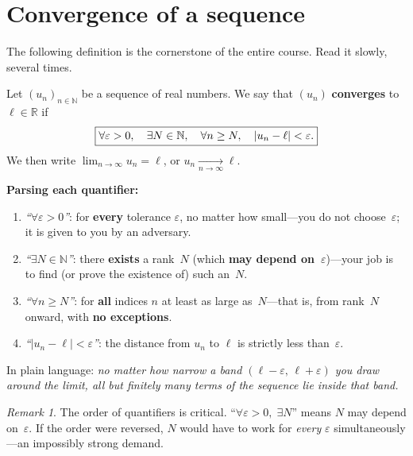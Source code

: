 \documentclass[12pt,a4paper,openany]{book}
\newcommand{\N}{\mathbb{N}}
\newcommand{\R}{\mathbb{R}}
\newcommand{\eps}{\varepsilon}
\newcommand{\abs}[1]{\left\lvert #1 \right\rvert}
\theoremstyle{definition}
\theoremstyle{remark}
\newtheorem{remark}{Remark}[chapter]
\begin{document}
\section{Convergence of a sequence}\label{sec:convergence}

The following definition is the cornerstone of the entire course. Read it
slowly, several times.

\begin{tcolorbox}[
   colback=blue!3!white,
   colframe=blue!60!black,
   title={\textbf{Definition (Convergence of a sequence)}},
   fonttitle=\bfseries,
   arc=2mm
]
\label{def:convergence}
Let $(u_n)_{n\in\N}$ be a sequence of real numbers. We say that $(u_n)$
\textbf{converges} to $\ell \in \R$ if
\[
   \boxed{%
   \forall \eps > 0, \quad \exists N \in \N, \quad \forall n \geq N, \quad
   \abs{u_n - \ell} < \eps.}
\]
We then write $\displaystyle \lim_{n\to\infty} u_n = \ell$, or
$u_n \xrightarrow[n\to\infty]{} \ell$.

\medskip
\textbf{Parsing each quantifier:}
\begin{enumerate}
\item \emph{``$\forall \eps > 0$''}: for \textbf{every} tolerance $\eps$, no
      matter how small---you do not choose~$\eps$; it is given to you by an
      adversary.
\item \emph{``$\exists N \in \N$''}: there \textbf{exists} a rank~$N$ (which
      \textbf{may depend on~$\eps$})---your job is to find (or prove the
      existence of) such an~$N$.
\item \emph{``$\forall n \geq N$''}: for \textbf{all} indices $n$ at least as
      large as~$N$---that is, from rank~$N$ onward, with \textbf{no exceptions}.
\item \emph{``$\abs{u_n - \ell} < \eps$''}: the distance from $u_n$ to $\ell$
      is strictly less than~$\eps$.
\end{enumerate}

\medskip
In plain language: \emph{no matter how narrow a band $(\ell-\eps,\,\ell+\eps)$
you draw around the limit, all but finitely many terms of the sequence lie
inside that band.}
\end{tcolorbox}

\begin{remark}
The order of quantifiers is critical.
``$\forall \eps > 0,\; \exists N$'' means $N$ may depend on~$\eps$.
If the order were reversed, $N$ would have to work for \emph{every} $\eps$
simultaneously---an impossibly strong demand.
\end{remark}
\end{document}

